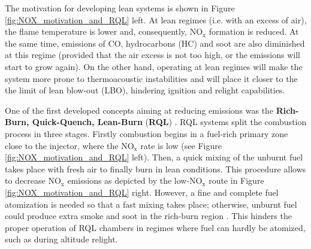 

The motivation for developing lean systems is shown in Figure \ref{fig:NOX_motivation_and_RQL} left. At lean regimes (i.e. with an excess of air), the flame temperature is lower and, consequently, NO$_\mathrm{x}$ formation is reduced. At the same time, emissions of CO, hydrocarbons (HC) and soot are also diminished at this regime (provided that the air excess is not too high, or the emissions will start to grow again). On the other hand, operating at lean regimes will make the system more prone to thermoacoustic instabilities and will place it closer to the the limit of lean blow-out (LBO), hindering ignition and relight capabilities. 

One of the first developed concepts aiming at reducing emissions was the \textbf{Rich-Burn, Quick-Quench, Lean-Burn} (\textbf{RQL})  . RQL systems split the combustion process in three stages. Firstly combustion begins in a fuel-rich primary zone close to the injector, where the NO$_\mathrm{x}$ rate is low (see Figure \ref{fig:NOX_motivation_and_RQL} left). Then, a quick mixing of the unburnt fuel takes place with fresh air to finally burn in lean conditions. This procedure allows to decrease NO$_\mathrm{x}$ emissions as depicted by the low-NO$_\mathrm{x}$ route in Figure \ref{fig:NOX_motivation_and_RQL} right. However, a fine and complete fuel atomization is needed so that a fast mixing takes place; otherwise, unburnt fuel could produce extra smoke and soot in the rich-burn region . This hinders the proper operation of RQL chambers in regimes where fuel can hardly be atomized, such as during altitude relight.

\newpage

